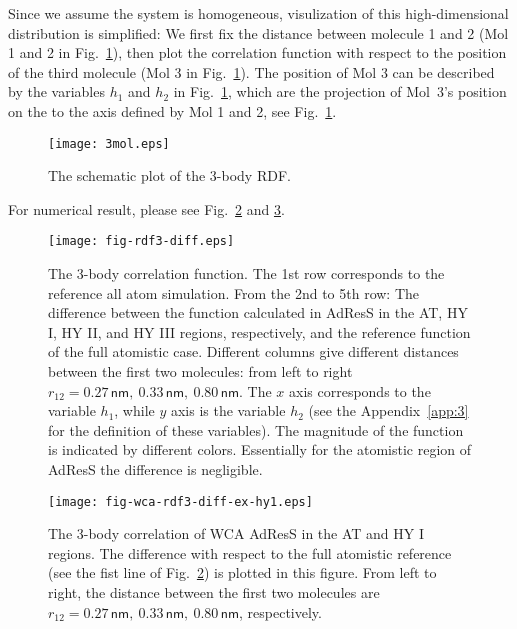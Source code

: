 \documentclass[aip,jcp,a4paper,reprint,onecolumn]{revtex4-1}
\begin{document}
Since we assume the system is homogeneous, visulization of this high-dimensional
distribution is simplified: We first fix the distance between molecule 1 and 2 (Mol
1 and 2 in Fig.~\ref{fig:tmp3}), then plot the correlation function with
respect to the position of the third molecule (Mol 3 in
Fig.~\ref{fig:tmp3}).  The position of Mol 3 can be described by
the variables $h_1$ and $h_2$ in Fig.~\ref{fig:tmp3}, which are
the projection of Mol~3's position on the to the
axis defined by Mol 1 and 2, see Fig.~\ref{fig:tmp3}.

\begin{figure}
  \centering
  \texttt{[image: 3mol.eps]}
  \caption{The schematic plot of the 3-body RDF.}\label{fig:tmp3}
\end{figure}

For numerical result, please see Fig.~\ref{fig:tmp1} and \ref{fig:tmp2}.
\begin{figure}
  \centering
  \texttt{[image: fig-rdf3-diff.eps]}
  \caption{The 3-body correlation function.  The 1st row corresponds to the reference all atom simulation.
    From the 2nd to 5th row:
    The difference between the function calculated in AdResS in the AT, HY I, HY II, and HY III
    regions, respectively, and the reference function of the full atomistic case.
    Different columns give different distances between
    the first two molecules: from left to right $r_{12} =
    0.27\,\textsf{nm},\ 0.33\,\textsf{nm},\  
    0.80\,\textsf{nm}$.  The $x$ axis corresponds to the variable $h_1$, while $y$
    axis is the variable $h_2$ (see the Appendix~\ref{app:3} for the
    definition of these variables).  The magnitude of the function is indicated by
    different colors. Essentially for the atomistic region of AdResS the difference is negligible.
  }
  \label{fig:tmp1}
\end{figure}
\begin{figure}
  \centering
  \texttt{[image: fig-wca-rdf3-diff-ex-hy1.eps]}
  \caption{The 3-body correlation of WCA AdResS in the AT
    and HY I regions.
    The difference with respect to the full atomistic reference
    (see the fist line of Fig.~\ref{fig:tmp1})
    is plotted in this figure. From left to right, the distance
    between the first two molecules are $r_{12} =
    0.27\,\textsf{nm},\ 0.33\,\textsf{nm},\  
    0.80\,\textsf{nm}$, respectively.
  }
  \label{fig:tmp2}
\end{figure}
\end{document}
